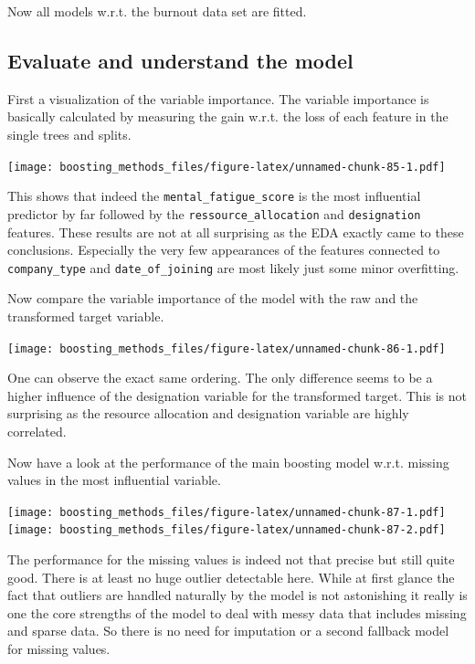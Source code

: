 \documentclass[
]{book}
\begin{document}
Now all models w.r.t. the burnout data set are fitted.

\hypertarget{evaluate-and-understand-the-model}{%
\subsection{Evaluate and understand the model}\label{evaluate-and-understand-the-model}}

First a visualization of the variable importance. The variable importance is basically calculated by measuring the gain w.r.t. the loss of each feature in the single trees and splits.

\texttt{[image: boosting\_methods\_files/figure-latex/unnamed-chunk-85-1.pdf]}

This shows that indeed the \texttt{mental\_fatigue\_score} is the most influential predictor by far followed by the \texttt{ressource\_allocation} and \texttt{designation} features. These results are not at all surprising as the EDA exactly came to these conclusions. Especially the very few appearances of the features connected to \texttt{company\_type} and \texttt{date\_of\_joining} are most likely just some minor overfitting.

Now compare the variable importance of the model with the raw and the transformed target variable.

\texttt{[image: boosting\_methods\_files/figure-latex/unnamed-chunk-86-1.pdf]}

One can observe the exact same ordering. The only difference seems to be a higher influence of the designation variable for the transformed target. This is not surprising as the resource allocation and designation variable are highly correlated.

Now have a look at the performance of the main boosting model w.r.t. missing values in the most influential variable.

\texttt{[image: boosting\_methods\_files/figure-latex/unnamed-chunk-87-1.pdf]} \texttt{[image: boosting\_methods\_files/figure-latex/unnamed-chunk-87-2.pdf]}

The performance for the missing values is indeed not that precise but still quite good. There is at least no huge outlier detectable here. While at first glance the fact that outliers are handled naturally by the model is not astonishing it really is one the core strengths of the model to deal with messy data that includes missing and sparse data. So there is no need for imputation or a second fallback model for missing values.
\end{document}
